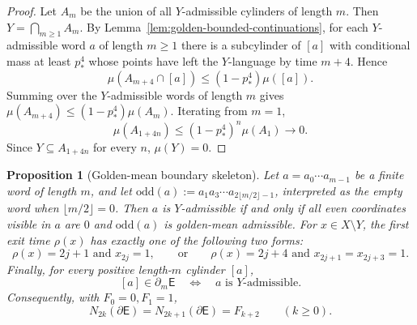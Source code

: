 \documentclass{etds}%
\numberwithin{equation}{section}
\theoremstyle{plain}
\newtheorem{proposition}[theorem]{Proposition}
\theoremstyle{definition}
\theoremstyle{remark}
\begin{document}
\begin{proof}
Let $A_m$ be the union of all $Y$-admissible cylinders of length $m$.  Then
$Y=\bigcap_{m\ge 1}A_m$.  By Lemma~\ref{lem:golden-bounded-continuations}, for
each $Y$-admissible word $a$ of length $m\ge 1$ there is a subcylinder of
$[a]$ with conditional mass at least $p_*^4$ whose points have left the
$Y$-language by time $m+4$.  Hence
\[
\mu(A_{m+4}\cap[a])\le (1-p_*^4)\mu([a]).
\]
Summing over the $Y$-admissible words of length $m$ gives
$\mu(A_{m+4})\le(1-p_*^4)\mu(A_m)$.  Iterating from $m=1$,
\[
\mu(A_{1+4n})\le (1-p_*^4)^n\mu(A_1)\to 0.
\]
Since $Y\subseteq A_{1+4n}$ for every $n$, $\mu(Y)=0$.
\end{proof}

\begin{proposition}[Golden-mean boundary skeleton]
\label{prop:golden-boundary-skeleton}
Let $a=a_0\cdots a_{m-1}$ be a finite word of length $m$, and let
$\mathrm{odd}(a):=a_1a_3\cdots a_{2\lfloor m/2\rfloor-1}$, interpreted as the
empty word when $\lfloor m/2\rfloor=0$.  Then $a$ is
$Y$-admissible if and only if all even coordinates visible in $a$ are $0$ and
$\mathrm{odd}(a)$ is golden-mean admissible.  For $x\in X\setminus Y$, the
first exit time $\rho(x)$ has exactly one of the following two forms:
\[
\rho(x)=2j+1\text{ and }x_{2j}=1,
\qquad\text{or}\qquad
\rho(x)=2j+4\text{ and }x_{2j+1}=x_{2j+3}=1.
\]
Finally, for every positive length-$m$ cylinder $[a]$,
\[
[a]\in\partial_m\mathsf{E}\quad\Longleftrightarrow\quad a
\text{ is }Y\text{-admissible}.
\]
Consequently, with $F_0=0,F_1=1$,
\[
N_{2k}(\partial\mathsf{E})=N_{2k+1}(\partial\mathsf{E})=F_{k+2}
\qquad(k\ge 0).
\]
\end{proposition}
\end{document}
